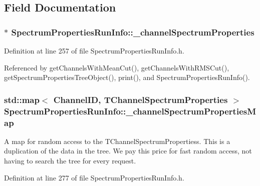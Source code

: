 \subsection{Field Documentation}
\hypertarget{class_spectrum_properties_run_info_a905d33381539ab3737b6c55261e0fc1f}{
\subsubsection[{\_\-channelSpectrumProperties}]{$\ast$ {\bf SpectrumPropertiesRunInfo::\_\-channelSpectrumProperties}}}
\label{class_spectrum_properties_run_info_a905d33381539ab3737b6c55261e0fc1f}


Definition at line 257 of file SpectrumPropertiesRunInfo.h.

Referenced by getChannelsWithMeanCut(), getChannelsWithRMSCut(), getSpectrumPropertiesTreeObject(), print(), and SpectrumPropertiesRunInfo().\hypertarget{class_spectrum_properties_run_info_a673b97ff771527ce85493856e80e7b83}{
\subsubsection[{\_\-channelSpectrumPropertiesMap}]{\setlength{\rightskip}{0pt plus 5cm}std::map$<$ {\bf ChannelID}, {\bf TChannelSpectrumProperties} $>$ {\bf SpectrumPropertiesRunInfo::\_\-channelSpectrumPropertiesMap}}}
\label{class_spectrum_properties_run_info_a673b97ff771527ce85493856e80e7b83}


A map for random access to the TChannelSpectrumPropertiess. This is a duplication of the data in the tree. We pay this price for fast random access, not having to search the tree for every request. 

Definition at line 277 of file SpectrumPropertiesRunInfo.h.


